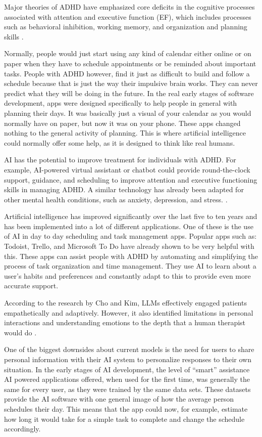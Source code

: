 \documentclass[english]{hogent-article}
\begin{document}
Major theories of ADHD have emphasized core deficits in the cognitive processes associated with attention and executive function (EF), which includes processes such as behavioral inhibition, working memory, and organization and planning skills \autocite{Molitor2017}.

Normally, people would just start using any kind of calendar either online or on paper when they have to schedule appointments or be reminded about important tasks. People with ADHD however, find it just as difficult to build and follow a schedule because that is just the way their impulsive brain works. They can never predict what they will be doing in the future. In the real early stages of software development, apps were designed specifically to help people in general with planning their days. It was basically just a visual of your calendar as you would normally have on paper, but now it was on your phone. These apps changed nothing to the general activity of planning. This is where artificial intelligence could normally offer some help, as it is designed to think like real humans. 

AI has the potential to improve treatment for individuals with ADHD. For example, AI-powered virtual assistant or chatbot could provide round-the-clock support, guidance, and scheduling to improve attention and executive functioning skills in managing ADHD. A similar technology has already been adapted for other mental health conditions, such as anxiety, depression, and stress. \autocite{Rahman2023}.

Artificial intelligence has improved significantly over the last five to ten years and has been implemented into a lot of different applications. One of these is the use of AI in day to day scheduling and task management apps. Popular apps such as: Todoist, Trello, and Microsoft To Do have already shown to be very helpful with this. These apps can assist people with ADHD by automating and simplifying the process of task organization and time management. They use AI to learn about a user’s habits and preferences and constantly adapt to this to provide even more accurate support. 

According to the research by Cho and Kim, LLMs effectively engaged patients empathetically and adaptively. However, it also identified limitations in personal interactions and understanding emotions to the depth that a human therapist would do \autocite{Berrezueta-Guzman2024}.

One of the biggest downsides about current models is the need for users to share personal information with their AI system to personalize responses to their own situation. In the early stages of AI development, the level of “smart” assistance AI powered applications offered, when used for the first time, was generally the same for every user, as they were trained by the same data sets. These datasets provide the AI software with one general image of how the average person schedules their day. This means that the app could now, for example, estimate how long it would take for a simple task to complete and change the schedule accordingly.
\end{document}
